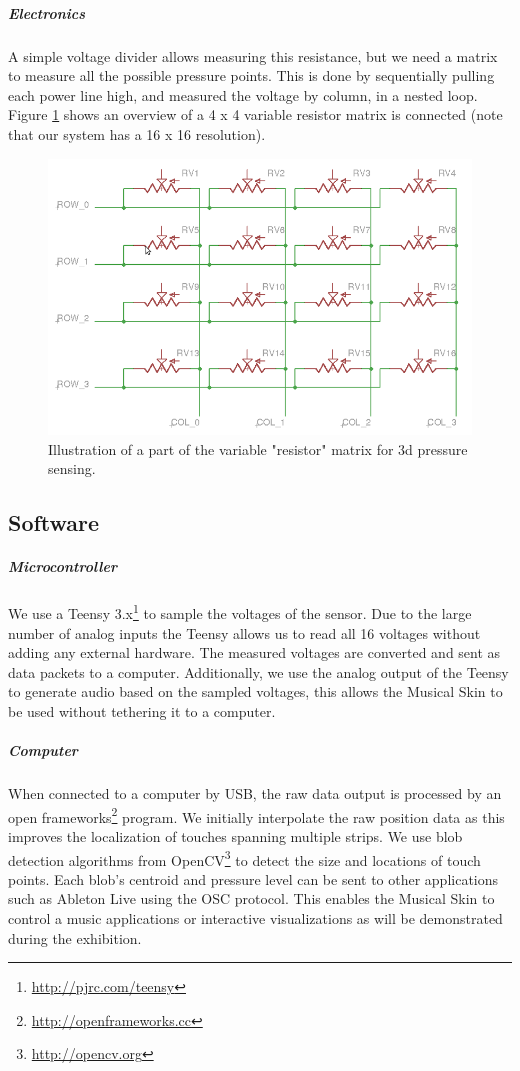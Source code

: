 \documentclass{sigchi-ext}
\begin{document}
\subparagraph{Electronics}
A simple voltage divider allows measuring this resistance, but we need a matrix to measure all the possible pressure points.
This is done by sequentially pulling each power line high, and measured the voltage by column, in a nested loop.
Figure \ref{fig:matrix} shows an overview of a 4 x 4 variable resistor matrix is connected (note that our system has a 16 x 16 resolution).

\begin{figure}
    \centering
    \includegraphics[width=0.75\columnwidth]{figures/matrix}
    \caption{Illustration of a part of the variable "resistor" matrix for 3d pressure sensing.}\label{fig:matrix}
\end{figure}


\subsection{Software}
\subparagraph{Microcontroller}

We use a Teensy 3.x\footnote{\url{http://pjrc.com/teensy}} to sample the voltages of the sensor. Due to the large number of analog inputs the Teensy allows us to read all 16 voltages without adding any external hardware.
The measured voltages are converted and sent as data packets to a computer. Additionally, we use the analog output of the Teensy to generate audio based on the sampled voltages, this allows the Musical Skin to be used without tethering it to a computer.

\subparagraph{Computer}
When connected to a computer by USB, the raw data output is processed by an open frameworks\footnote{\url{http://openframeworks.cc}} program. We initially interpolate the raw position data as this improves the localization of touches spanning multiple strips. We use blob detection algorithms from OpenCV\footnote{\url{http://opencv.org}} to detect the size and locations of touch points. Each blob's centroid and pressure level can be sent to other applications such as Ableton Live using the OSC protocol. This enables the Musical Skin to control a music applications or interactive visualizations as will be demonstrated during the exhibition.
\end{document}
